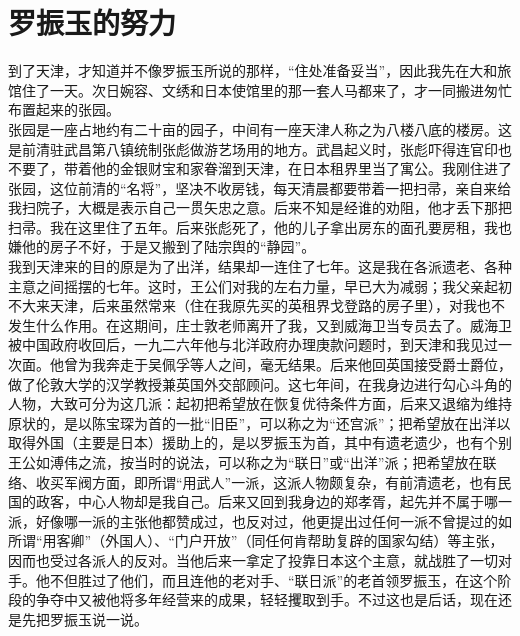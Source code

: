 \fancyhead[RO]{} %
\fancyhead[LE]{} %
\chapter*{罗振玉的努力}
\thispagestyle{empty}
到了天津，才知道并不像罗振玉所说的那样，“住处准备妥当”，因此我先在大和旅馆住了一天。次日婉容、文绣和日本使馆里的那一套人马都来了，才一同搬进匆忙布置起来的张园。\\

张园是一座占地约有二十亩的园子，中间有一座天津人称之为八楼八底的楼房。这是前清驻武昌第八镇统制张彪做游艺场用的地方。武昌起义时，张彪吓得连官印也不要了，带着他的金银财宝和家眷溜到天津，在日本租界里当了寓公。我刚住进了张园，这位前清的“名将”，坚决不收房钱，每天清晨都要带着一把扫帚，亲自来给我扫院子，大概是表示自己一贯矢忠之意。后来不知是经谁的劝阻，他才丢下那把扫帚。我在这里住了五年。后来张彪死了，他的儿子拿出房东的面孔要房租，我也嫌他的房子不好，于是又搬到了陆宗舆的“静园”。\\

我到天津来的目的原是为了出洋，结果却一连住了七年。这是我在各派遗老、各种主意之间摇摆的七年。这时，王公们对我的左右力量，早已大为减弱；我父亲起初不大来天津，后来虽然常来（住在我原先买的英租界戈登路的房子里），对我也不发生什么作用。在这期间，庄士敦老师离开了我，又到威海卫当专员去了。威海卫被中国政府收回后，一九二六年他与北洋政府办理庚款问题时，到天津和我见过一次面。他曾为我奔走于吴佩孚等人之间，毫无结果。后来他回英国接受爵士爵位，做了伦敦大学的汉学教授兼英国外交部顾问。这七年间，在我身边进行勾心斗角的人物，大致可分为这几派：起初把希望放在恢复优待条件方面，后来又退缩为维持原状的，是以陈宝琛为首的一批“旧臣”，可以称之为“还宫派”；把希望放在出洋以取得外国（主要是日本）援助上的，是以罗振玉为首，其中有遗老遗少，也有个别王公如溥伟之流，按当时的说法，可以称之为“联日”或“出洋”派；把希望放在联络、收买军阀方面，即所谓“用武人”一派，这派人物颇复杂，有前清遗老，也有民国的政客，中心人物却是我自己。后来又回到我身边的郑孝胥，起先并不属于哪一派，好像哪一派的主张他都赞成过，也反对过，他更提出过任何一派不曾提过的如所谓“用客卿”（外国人）、“门户开放”（同任何肯帮助复辟的国家勾结）等主张，因而也受过各派人的反对。当他后来一拿定了投靠日本这个主意，就战胜了一切对手。他不但胜过了他们，而且连他的老对手、“联日派”的老首领罗振玉，在这个阶段的争夺中又被他将多年经营来的成果，轻轻攫取到手。不过这也是后话，现在还是先把罗振玉说一说。\\


